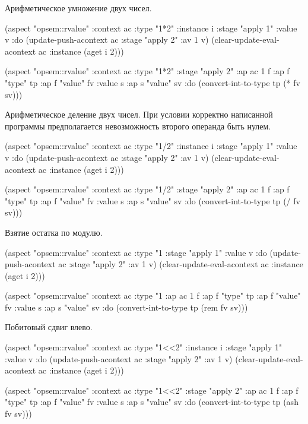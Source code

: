 \documentclass[12pt,twoside,russian]{article}
\begin{document}
Арифметическое умножение двух чисел.

\begin{ABMLCode}
(aspect "opsem::rvalue" :context ac :type "1*2" :instance i 
  :stage "apply 1" :value v :do 
  (update-push-acontext ac :stage "apply 2" :av 1 v)
  (clear-update-eval-acontext ac :instance (aget i 2)))

(aspect "opsem::rvalue" :context ac :type "1*2" :stage "apply 2" 
  :ap ac 1 f :ap f "type" tp :ap f "value" fv :value s 
  :ap s "value" sv :do 
  (convert-int-to-type tp (* fv sv)))
\end{ABMLCode}

Арифметическое деление двух чисел. При условии корректно написанной программы предполагается невозможность второго операнда быть нулем.

\begin{ABMLCode}
(aspect "opsem::rvalue" :context ac :type "1/2" :instance i 
  :stage "apply 1" :value v :do 
  (update-push-acontext ac :stage "apply 2" :av 1 v)
  (clear-update-eval-acontext ac :instance (aget i 2)))

(aspect "opsem::rvalue" :context ac :type "1/2" :stage "apply 2" 
    :ap ac 1 f :ap f "type" tp :ap f "value" fv :value s 
    :ap s "value" sv :do 
    (convert-int-to-type tp (/ fv sv)))
\end{ABMLCode}

Взятие остатка по модулю.

\begin{ABMLCode}
(aspect "opsem::rvalue" :context ac :type "1%
  :stage "apply 1" :value v :do 
  (update-push-acontext ac :stage "apply 2" :av 1 v)
  (clear-update-eval-acontext ac :instance (aget i 2)))

(aspect "opsem::rvalue" :context ac :type "1%
  :ap ac 1 f :ap f "type" tp :ap f "value" fv :value s 
  :ap s "value" sv :do 
  (convert-int-to-type tp (rem fv sv)))
\end{ABMLCode}

Побитовый сдвиг влево.

\begin{ABMLCode}
(aspect "opsem::rvalue" :context ac :type "1<<2" :instance i 
  :stage "apply 1" :value v :do 
  (update-push-acontext ac :stage "apply 2" :av 1 v)
  (clear-update-eval-acontext ac :instance (aget i 2)))
  
(aspect "opsem::rvalue" :context ac :type "1<<2" :stage "apply 2" 
  :ap ac 1 f :ap f "type" tp :ap f "value" fv :value s 
  :ap s "value" sv :do 
  (convert-int-to-type tp (ash fv sv)))
\end{ABMLCode}
\end{document}
